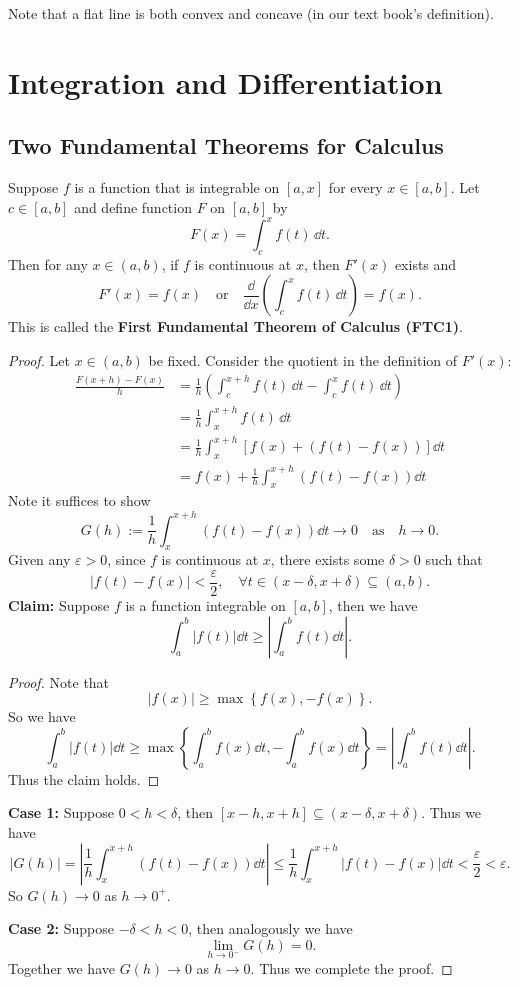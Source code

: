 \documentclass[a4paper]{ctexart}
\begin{document}
	\begin{myrmk}
		Note that a flat line is both convex and concave (in our text book's definition).
	\end{myrmk}

	\newpage
	\section{Integration and Differentiation}
	\subsection{Two Fundamental Theorems for Calculus}
	\begin{mythm}
		Suppose $f$ is a function that is integrable on $[a,x]$ for every $x\in [a,b]$. Let $c\in [a,b]$ and define function $F$ on $[a,b]$ by
		\[
		F(x) = \int_c^x f(t)\, \dd t.
		\]
		Then for any $x\in (a,b)$, if $f$ is continuous at $x$, then $F'(x)$ exists and
		\[
		F'(x) = f(x)\quad\text{or}\quad \frac{\dd}{\dd x} \left( \int_c^x f(t)\, \dd t \right) = f(x).
		\]
		This is called the \textbf{First Fundamental Theorem of Calculus (FTC1)}.
	\end{mythm}
	\begin{proof}
		Let $x\in (a,b)$ be fixed. Consider the quotient in the definition of $F'(x)$:
		\[
		\begin{aligned}
			\frac{F(x+h)-F(x)}{h} 
			&= \frac{1}{h} \left( \int_c^{x+h} f(t)\, \dd t - \int_c^x f(t)\, \dd t \right) \\
			&= \frac{1}{h} \int_x^{x+h} f(t)\, \dd t\\
			&= \frac{1}{h} \int_x^{x+h} \left[ f(x)+\left(f(t)-f(x)\right)\right] \dd t\\
			&= f(x) + \frac{1}{h} \int_x^{x+h} \left( f(t)-f(x) \right) \dd t
		\end{aligned}
		\]
		Note it suffices to show 
		\[
		G(h):= \frac{1}{h} \int_x^{x+h} \left( f(t)-f(x) \right) \dd t \to 0 \quad \text{as}\quad h\to 0.
		\]
		Given any $\varepsilon>0$, since $f$ is continuous at $x$, there exists some $\delta>0$ such that
		\[
		|f(t)-f(x)| < \frac{\varepsilon}{2}, \quad \forall t\in (x-\delta, x+\delta)\subseteq (a,b).
		\]
		\textbf{Claim:} Suppose $f$ is a function integrable on $[a,b]$, then we have
		\[
		\int_a^b |f(t)| \dd t \geq \left| \int_a^b f(t) \dd t \right|.
		\]
		\begin{proof}
			Note that
			\[
			|f(x)| \ge \max\left\{ f(x), -f(x) \right\}.
			\]
			So we have
			\[
			\int_a^b |f(t)| \dd t \ge \max\left\{\int_a^b f(x)\dd t, -\int_a^b f(x)\dd t\right\} = \left|\int_a^b f(t) \dd t\right|.
			\]
			Thus the claim holds.
		\end{proof}
		\medskip

		\textbf{Case 1:} Suppose $0<h<\delta$, then $[x-h, x+h] \subseteq (x-\delta, x+\delta)$. Thus we have
		\[
		|G(h)| = \left| \frac{1}{h} \int_x^{x+h} \left( f(t)-f(x) \right) \dd t \right| \leq \frac{1}{h} \int_x^{x+h} |f(t)-f(x)| \dd t < \frac{\varepsilon}{2} < \varepsilon.
		\]
		So $G(h)\to 0$ as $h\to 0^+$.

		\textbf{Case 2:} Suppose $-\delta < h < 0$, then analogously we have
		\[
		\lim _{h\to 0^-} G(h) = 0.
		\]
		Together we have $G(h)\to 0$ as $h\to 0$. Thus we complete the proof.
	\end{proof}
\end{document}
